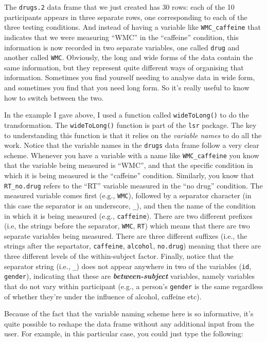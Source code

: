 \documentclass[
]{book}
\begin{document}
The \texttt{drugs.2} data frame that we just created has 30 rows: each of the 10 participants appears in three separate rows, one corresponding to each of the three testing conditions. And instead of having a variable like \texttt{WMC\_caffeine} that indicates that we were measuring ``WMC'' in the ``caffeine'' condition, this information is now recorded in two separate variables, one called \texttt{drug} and another called \texttt{WMC}. Obviously, the long and wide forms of the data contain the same information, but they represent quite different ways of organising that information. Sometimes you find yourself needing to analyse data in wide form, and sometimes you find that you need long form. So it's really useful to know how to switch between the two.

In the example I gave above, I used a function called \texttt{wideToLong()} to do the transformation. The \texttt{wideToLong()} function is part of the \texttt{lsr} package. The key to understanding this function is that it relies on the \emph{variable names} to do all the work. Notice that the variable names in the \texttt{drugs} data frame follow a very clear scheme. Whenever you have a variable with a name like \texttt{WMC\_caffeine} you know that the variable being measured is ``WMC'', and that the specific condition in which it is being measured is the ``caffeine'' condition. Similarly, you know that \texttt{RT\_no.drug} refers to the ``RT'' variable measured in the ``no drug'' condition. The measured variable comes first (e.g., \texttt{WMC}), followed by a separator character (in this case the separator is an underscore, \texttt{\_}), and then the name of the condition in which it is being measured (e.g., \texttt{caffeine}). There are two different prefixes (i.e, the strings before the separator, \texttt{WMC}, \texttt{RT}) which means that there are two separate variables being measured. There are three different suffixes (i.e., the strings after the separtator, \texttt{caffeine}, \texttt{alcohol}, \texttt{no.drug}) meaning that there are three different levels of the within-subject factor. Finally, notice that the separator string (i.e., \texttt{\_}) does not appear anywhere in two of the variables (\texttt{id}, \texttt{gender}), indicating that these are \textbf{\emph{between-subject}} variables, namely variables that do not vary within participant (e.g., a person's \texttt{gender} is the same regardless of whether they're under the influence of alcohol, caffeine etc).

Because of the fact that the variable naming scheme here is so informative, it's quite possible to reshape the data frame without any additional input from the user. For example, in this particular case, you could just type the following:
\end{document}

